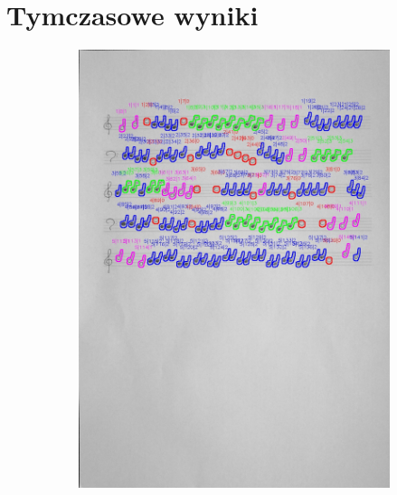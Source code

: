 \documentclass[11pt]{article}
\begin{document}
\pagebreak

\section{Tymczasowe wyniki}

\begin{figure}[H]
    \centering
    \begin{subfigure}{.5\textwidth}
        \centering
        \graphicspath{ {blobs/} }
        \includegraphics[width=\linewidth]{4_cnts.jpg}
        \label{fig:sub1}
    \end{subfigure}%
    \begin{subfigure}{.5\textwidth}
        \centering
        \graphicspath{ {blobs/} }

\end{subfigure}
\end{figure}
\end{document}
